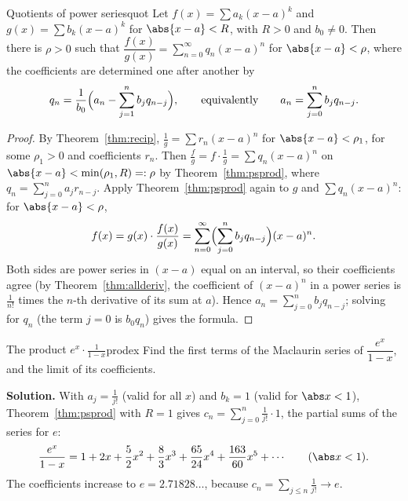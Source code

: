\documentclass[11pt]{article}
\begin{document}
\begin{thm}{Quotients of power series}{quot}
Let $f(x)=\sum a_k(x-a)^k$ and $g(x)=\sum b_k(x-a)^k$ for $\abs{x-a}<R$, with $R>0$ and $b_0\ne0$. Then there is $\rho>0$ such that $\dfrac{f(x)}{g(x)}=\sum_{n=0}^\infty q_n(x-a)^n$ for $\abs{x-a}<\rho$, where the coefficients are determined one after another by
\[
q_n=\frac1{b_0}\Bigl(a_n-\sum_{j=1}^nb_jq_{n-j}\Bigr),\qquad\text{equivalently}\qquad a_n=\sum_{j=0}^nb_jq_{n-j}.
\]
\end{thm}
\begin{proof}
By Theorem~\ref{thm:recip}, $\frac1g=\sum r_n(x-a)^n$ for $\abs{x-a}<\rho_1$, for some $\rho_1>0$ and coefficients $r_n$. Then $\frac fg=f\cdot\frac1g=\sum q_n(x-a)^n$ on $\abs{x-a}<\min(\rho_1,R)=:\rho$ by Theorem~\ref{thm:psprod}, where $q_n=\sum_{j=0}^na_jr_{n-j}$. Apply Theorem~\ref{thm:psprod} again to $g$ and $\sum q_n(x-a)^n$: for $\abs{x-a}<\rho$,
\[
f(x)=g(x)\cdot\frac{f(x)}{g(x)}=\sum_{n=0}^\infty\Bigl(\sum_{j=0}^nb_jq_{n-j}\Bigr)(x-a)^n .
\]
Both sides are power series in $(x-a)$ equal on an interval, so their coefficients agree (by Theorem~\ref{thm:allderiv}, the coefficient of $(x-a)^n$ in a power series is $\frac{1}{n!}$ times the $n$-th derivative of its sum at $a$). Hence $a_n=\sum_{j=0}^nb_jq_{n-j}$; solving for $q_n$ (the term $j=0$ is $b_0q_n$) gives the formula.
\end{proof}

\begin{exmp}{The product $e^x\cdot\frac1{1-x}$}{prodex}
Find the first terms of the Maclaurin series of $\dfrac{e^x}{1-x}$, and the limit of its coefficients.

\textbf{Solution.} With $a_j=\frac1{j!}$ (valid for all $x$) and $b_k=1$ (valid for $\abs x<1$), Theorem~\ref{thm:psprod} with $R=1$ gives $c_n=\sum_{j=0}^n\frac1{j!}\cdot1$, the partial sums of the series for $e$:
\[
\frac{e^x}{1-x}=1+2x+\frac52x^2+\frac83x^3+\frac{65}{24}x^4+\frac{163}{60}x^5+\cdots\qquad(\abs x<1).
\]
The coefficients increase to $e=2.71828\dots$, because $c_n=\sum_{j\le n}\frac1{j!}\to e$.
\end{exmp}
\end{document}
